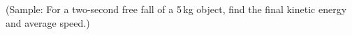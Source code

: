 \documentclass[11pt,pdfa,lastpage,minititle]{MishoNote}
\begin{document}
\noindent
(Sample: For a two-second free fall of a 5\,kg object, find the final kinetic energy and average speed.)
\begin{center}
\end{center}

\OutputNote
\end{document}
